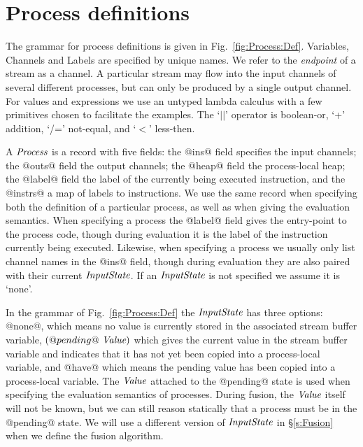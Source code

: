 
\clearpage{}
\section{Process definitions}



The grammar for process definitions is given in Fig.~\ref{fig:Process:Def}. Variables, Channels and Labels are specified by unique names. We refer to the \emph{endpoint} of a stream as a channel. A particular stream may flow into the input channels of several different processes, but can only be produced by a single output channel. For values and expressions we use an untyped lambda calculus with a few primitives chosen to facilitate the examples. The `$||$' operator is boolean-or, `+' addition, `/=' not-equal, and `$<$' less-then.

A $\textit{Process}$ is a record with five fields: the @ins@ field specifies the input channels; the @outs@ field the output channels; the @heap@ field the process-local heap; the @label@ field the label of the currently being executed instruction, and the @instrs@ a map of labels to instructions. We use the same record when specifying both the definition of a particular process, as well as when giving the evaluation semantics. When specifying a process the @label@ field gives the entry-point to the process code, though during evaluation it is the label of the instruction currently being executed. Likewise, when specifying a process we usually only list channel names in the @ins@ field, though during evaluation they are also paired with their current $\textit{InputState}$. If an $\textit{InputState}$ is not specified we assume it is `none'.

In the grammar of Fig.~\ref{fig:Process:Def} the $\textit{InputState}$ has three options: @none@, which means no value is currently stored in the associated stream buffer variable, $(@pending@~\textit{Value})$ which gives the current value in the stream buffer variable and indicates that it has not yet been copied into a process-local variable, and @have@ which means the pending value has been copied into a process-local variable. The $\textit{Value}$ attached to the @pending@ state is used when specifying the evaluation semantics of processes. During fusion, the $\textit{Value}$ itself will not be known, but we can still reason statically that a process must be in the @pending@ state. We will use a different version of $\textit{InputState}$ in \S\ref{s:Fusion} when we define the fusion algorithm.

